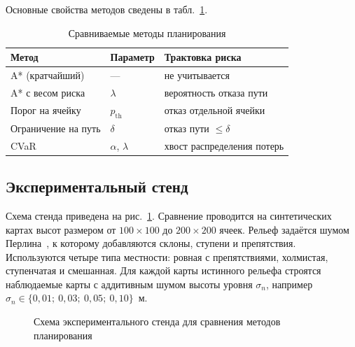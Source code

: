 \documentclass{misisarticle}
\begin{document}
Основные свойства методов сведены в табл.~\ref{tab:methods}.

\begin{table}[htbp]
  \caption{Сравниваемые методы планирования}
  \label{tab:methods}
  \centering
  \small
  \begin{tabular}{p{}p{}p{}}
    \toprule
    \textbf{Метод} & \textbf{Параметр} & \textbf{Трактовка риска} \\
    \midrule
    A* (кратчайший) & --- & не учитывается \\
    A* с весом риска & $\lambda$ & вероятность отказа пути \\
    Порог на ячейку & $p_{\mathrm{th}}$ & отказ отдельной ячейки \\
    Ограничение на путь & $\delta$ & отказ пути $\le \delta$ \\
    CVaR & $\alpha$, $\lambda$ & хвост распределения потерь \\
    \bottomrule
  \end{tabular}
\end{table}

\subsection{Экспериментальный стенд}

Схема стенда приведена на рис.~\ref{fig:pipeline}. Сравнение проводится на синтетических картах высот размером от $100 \times 100$ до $200 \times 200$ ячеек. Рельеф задаётся шумом Перлина~\cite{perlin2002}, к которому добавляются склоны, ступени и препятствия. Используются четыре типа местности: ровная с препятствиями, холмистая, ступенчатая и смешанная. Для каждой карты истинного рельефа строятся наблюдаемые карты с аддитивным шумом высоты уровня $\sigma_n$, например $\sigma_n \in \{0{,}01;\ 0{,}03;\ 0{,}05;\ 0{,}10\}$~м.

\begin{figure}[htbp]
  \centering
  \caption{Схема экспериментального стенда для сравнения методов планирования}
  \label{fig:pipeline}
\end{figure}
\end{document}
